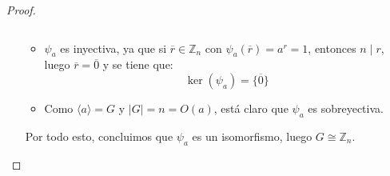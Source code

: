 \begin{teo}
\begin{proof}
\begin{itemize}
\begin{itemize}
\begin{equation*}
                        \end{equation*}
                    \item $\psi_a$ es inyectiva, ya que si $\overline{r}\in \mathbb{Z}_n$ con $\psi_a(\overline{r}) = a^r = 1$, entonces $n\mid r$, luego $\overline{r} = \overline{0}$ y se tiene que:
                        \begin{equation*}
                            \ker(\psi_a) = \{\overline{0}\}
                        \end{equation*}
                    \item Como $\langle a \rangle =G$ y $|G| = n = O(a)$, está claro que $\psi_a$ es sobreyectiva.
                \end{itemize}
                Por todo esto, concluimos que $\psi_a$ es un isomorfismo, luego $G\cong \mathbb{Z}_n$.
        \end{itemize}
    \end{proof}
\end{teo}


